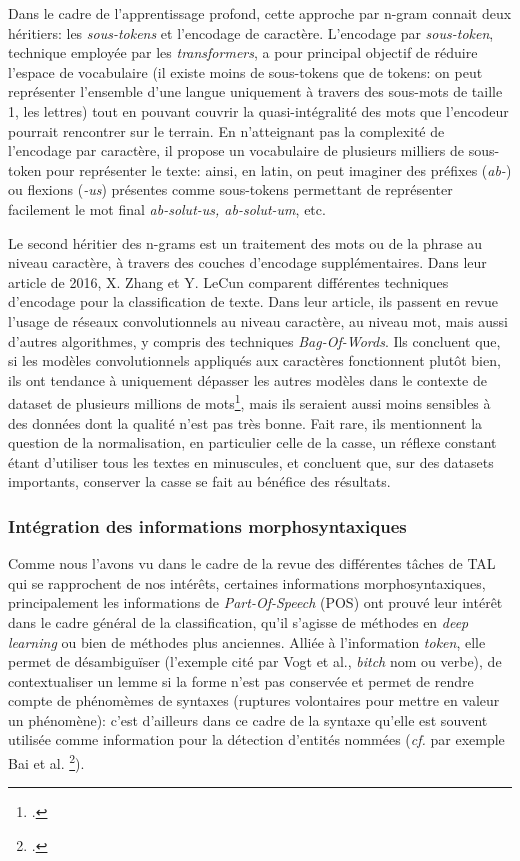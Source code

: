 
Dans le cadre de l'apprentissage profond, cette approche par n-gram connait deux héritiers: les \textit{sous-tokens} et l'encodage de caractère. L'encodage par \textit{sous-token}, technique employée par les \textit{transformers}, a pour principal objectif de réduire l'espace de vocabulaire (il existe moins de sous-tokens que de tokens: on peut représenter l'ensemble d'une langue uniquement à travers des sous-mots de taille 1, les lettres) tout en pouvant couvrir la quasi-intégralité des mots que l'encodeur pourrait rencontrer sur le terrain. En n'atteignant pas la complexité de l'encodage par caractère, il propose un vocabulaire de plusieurs milliers de sous-token pour représenter le texte: ainsi, en latin, on peut imaginer des préfixes (\textit{ab-}) ou flexions (\textit{-us}) présentes comme sous-tokens permettant de représenter facilement le mot final \textit{ab-solut-us, ab-solut-um}, etc.

Le second héritier des n-grams est un traitement des mots ou de la phrase au niveau caractère, à travers des couches d'encodage supplémentaires. Dans leur article de 2016, X. Zhang et Y. LeCun comparent différentes techniques d'encodage pour la classification de texte. Dans leur article, ils passent en revue l'usage de réseaux convolutionnels au niveau caractère, au niveau mot, mais aussi d'autres algorithmes, y compris des techniques \textit{Bag-Of-Words}. Ils concluent que, si les modèles convolutionnels appliqués aux caractères fonctionnent plutôt bien, ils ont tendance à uniquement dépasser les autres modèles dans le contexte de dataset de plusieurs millions de mots\footcite[p. 7]{zhang_text_2016}, mais ils seraient aussi moins sensibles à des données dont la qualité n'est pas très bonne. Fait rare, ils mentionnent la question de la normalisation, en particulier celle de la casse, un réflexe constant étant d'utiliser tous les textes en minuscules, et concluent que, sur des datasets importants, conserver la casse se fait au bénéfice des résultats. 



\subsubsection{Intégration des informations morphosyntaxiques}

Comme nous l'avons vu dans le cadre de la revue des différentes tâches de TAL qui se rapprochent de nos intérêts, certaines informations morphosyntaxiques, principalement les informations de \textit{Part-Of-Speech} (POS) ont prouvé leur intérêt dans le cadre général de  la classification, qu'il s'agisse de méthodes en \textit{deep learning} ou bien de méthodes plus anciennes. Alliée à l'information \textit{token}, elle permet de désambiguïser (l'exemple cité par Vogt et al., \textit{bitch} nom ou verbe), de contextualiser un lemme si la forme n'est pas conservée et permet de rendre compte de phénomèmes de syntaxes (ruptures volontaires pour mettre en valeur un phénomène): c'est d'ailleurs dans ce cadre de la syntaxe qu'elle est souvent utilisée comme information pour la détection d'entités nommées (\textit{cf.} par exemple  Bai et al. \footcite{bai_adversarial_2020}). 

